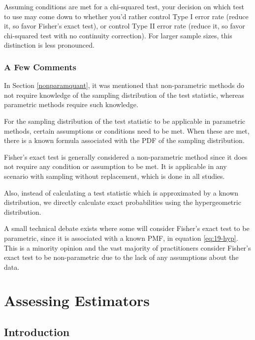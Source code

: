 \documentclass[
]{book}
\theoremstyle{definition}
\theoremstyle{definition}
\theoremstyle{definition}
\theoremstyle{definition}
\theoremstyle{remark}
\begin{document}
Assuming conditions are met for a chi-squared test, your decision on which test to use may come down to whether you'd rather control Type I error rate (reduce it, so favor Fisher's exact test), or control Type II error rate (reduce it, so favor chi-squared test with no continuity correction). For larger sample sizes, this distinction is less pronounced.

\hypertarget{a-few-comments-1}{%
\subsection{A Few Comments}\label{a-few-comments-1}}

In Section \ref{nonparamquant}, it was mentioned that non-parametric methods do not require knowledge of the sampling distribution of the test statistic, whereas parametric methods require such knowledge.

For the sampling distribution of the test statistic to be applicable in parametric methods, certain assumptions or conditions need to be met. When these are met, there is a known formula associated with the PDF of the sampling distribution.

Fisher's exact test is generally considered a non-parametric method since it does not require any condition or assumption to be met. It is applicable in any scenario with sampling without replacement, which is done in all studies.

Also, instead of calculating a test statistic which is approximated by a known distribution, we directly calculate exact probabilities using the hypergeometric distribution.

A small technical debate exists where some will consider Fisher's exact test to be parametric, since it is associated with a known PMF, in equation \eqref{eq:19-hyp}. This is a minority opinion and the vast majority of practitioners consider Fisher's exact test to be non-parametric due to the lack of any assumptions about the data.

\hypertarget{est}{%
\chapter{Assessing Estimators}\label{est}}

\hypertarget{introduction-10}{%
\section{Introduction}\label{introduction-10}}
\end{document}
